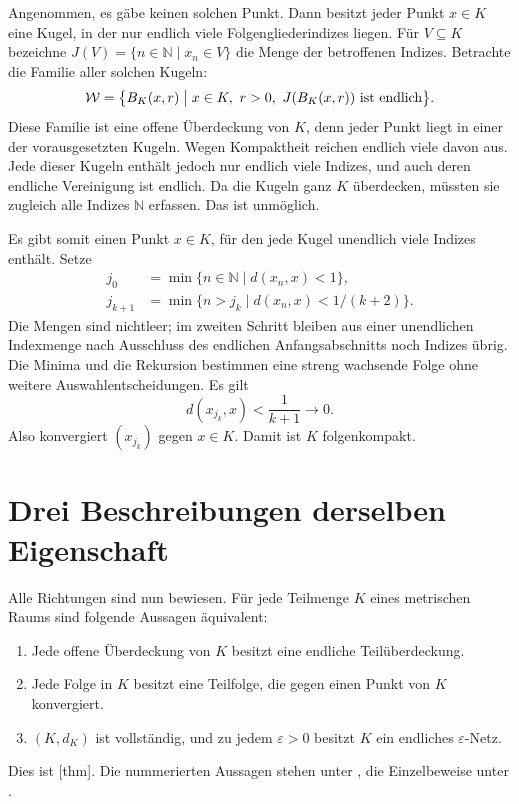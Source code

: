 Angenommen, es gäbe keinen solchen Punkt. Dann besitzt jeder
Punkt \(x\in K\) eine Kugel, in der nur endlich viele
Folgengliederindizes liegen. Für \(V\subseteq K\) bezeichne
\(J(V)=\{n\in\mathbb N\mid x_n\in V\}\) die Menge der
betroffenen Indizes. Betrachte die Familie aller solchen Kugeln:
\[
 \mathcal W=
 \bigl\{B_K(x,r)\bigm|x\in K,\ r>0,
       \ J(B_K(x,r))\text{ ist endlich}\bigr\}.
\]
Diese Familie ist eine offene Überdeckung von \(K\), denn
jeder Punkt liegt in einer der vorausgesetzten Kugeln.
Wegen Kompaktheit reichen endlich viele davon aus. Jede dieser
Kugeln enthält jedoch nur endlich viele Indizes, und auch deren
endliche Vereinigung ist endlich. Da die Kugeln ganz \(K\)
überdecken, müssten sie zugleich alle Indizes \(\mathbb N\)
erfassen. Das ist unmöglich.

Es gibt somit einen Punkt \(x\in K\), für den jede Kugel
unendlich viele Indizes enthält. Setze
\[
 \begin{aligned}
 j_0&=\min\{n\in\mathbb N\mid d(x_n,x)<1\},\\
 j_{k+1}&=\min\{n>j_k\mid d(x_n,x)<1/(k+2)\}.
 \end{aligned}
\]
Die Mengen sind nichtleer; im zweiten Schritt bleiben aus
einer unendlichen Indexmenge nach Ausschluss des endlichen
Anfangsabschnitts noch Indizes übrig. Die Minima und die
Rekursion bestimmen eine streng wachsende Folge ohne weitere
Auswahlentscheidungen. Es gilt
\[
 d(x_{j_k},x)<\frac1{k+1}\longrightarrow0.
\]
Also konvergiert \((x_{j_k})\) gegen \(x\in K\).
Damit ist \(K\) folgenkompakt.

\section*{Drei Beschreibungen derselben Eigenschaft}

Alle Richtungen sind nun bewiesen. Für jede Teilmenge \(K\)
eines metrischen Raums sind folgende Aussagen äquivalent:
\begin{enumerate}
 \item Jede offene Überdeckung von \(K\) besitzt eine endliche
       Teilüberdeckung.
 \item Jede Folge in \(K\) besitzt eine Teilfolge, die gegen
       einen Punkt von \(K\) konvergiert.
 \item \((K,d_K)\) ist vollständig, und zu jedem
       \(\varepsilon>0\) besitzt \(K\) ein endliches
       \(\varepsilon\)-Netz.
\end{enumerate}
Dies ist [thm].
Die nummerierten Aussagen stehen unter \CompactnessMainLink{},
die Einzelbeweise unter
\CompactnessProofsLink{}.

